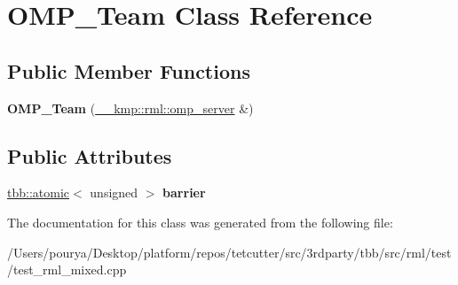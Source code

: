 \hypertarget{classOMP__Team}{}\section{O\+M\+P\+\_\+\+Team Class Reference}
\label{classOMP__Team}
\subsection*{Public Member Functions}
\begin{DoxyCompactItemize}
\item 
\hypertarget{classOMP__Team_af7f3cdeaf904f2f1e300d1fdf8490b7b}{}{\bfseries O\+M\+P\+\_\+\+Team} (\hyperlink{class____kmp_1_1rml_1_1omp__server}{\+\_\+\+\_\+kmp\+::rml\+::omp\+\_\+server} \&)\label{classOMP__Team_af7f3cdeaf904f2f1e300d1fdf8490b7b}

\end{DoxyCompactItemize}
\subsection*{Public Attributes}
\begin{DoxyCompactItemize}
\item 
\hypertarget{classOMP__Team_a6bc5d7ff973a8af56af5aca420ba49b9}{}\hyperlink{structtbb_1_1atomic}{tbb\+::atomic}$<$ unsigned $>$ {\bfseries barrier}\label{classOMP__Team_a6bc5d7ff973a8af56af5aca420ba49b9}

\end{DoxyCompactItemize}


The documentation for this class was generated from the following file\+:\begin{DoxyCompactItemize}
\item 
/\+Users/pourya/\+Desktop/platform/repos/tetcutter/src/3rdparty/tbb/src/rml/test/test\+\_\+rml\+\_\+mixed.\+cpp\end{DoxyCompactItemize}
